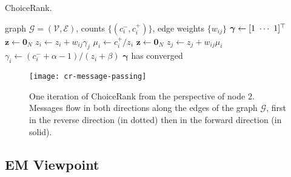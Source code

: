\begin{algorithm}
  \caption{ChoiceRank.}
  \label{cr:alg:choicerank}
  \begin{algorithmic}[1]
    \Require graph $\mathcal{G} = (\mathcal{V}, \mathcal{E})$, counts $\{ (c^-_i, c^+_i) \}$, edge weights $\{ w_{ij} \}$
    \State $\bm{\gamma} \gets [1 \ \cdots \ 1]^\Tr$
    \Repeat
      \State $\bm{z} \gets \bm{0}_N$
       $z_i \gets z_i + w_{ij} \gamma_j$ \label{cr:line:msg1}
       $\mu_i \gets c^+_i / z_i$
      \State $\bm{z} \gets \bm{0}_N$
       $z_j \gets z_j + w_{ij} \mu_i$ \label{cr:line:msg2}
       $\gamma_i \gets (c^-_i + \alpha - 1) / (z_i + \beta)$
    \Until $\bm{\gamma}$ has converged
  \end{algorithmic}
\end{algorithm}

\begin{figure}[t]
  \centering
  \texttt{[image: cr-message-passing]}
  \caption{One iteration of ChoiceRank from the perspective of node $2$.
  Messages flow in both directions along the edges of the graph $\mathcal{G}$, first in the reverse direction (in dotted) then in the forward direction (in solid).}
  \label{cr:fig:msgpassing}
\end{figure}

\subsection{EM Viewpoint}

